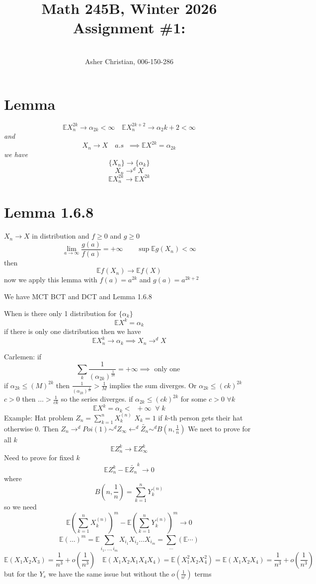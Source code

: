 \documentclass[11pt]{article}
\newcommand{\cnum}{Math 245B}
\newcommand{\ced}{Winter 2026}
\newcommand{\ctitle}[4]{\title{\vspace{-0.5in}\cnum, \ced\\Assignment #1: #2}\author{\vspace{-0.35in}\\#3, #4}}
\begin{document}
\ctitle{\#1}{}{Asher Christian}{006-150-286}
\date{}
\maketitle
\section{Lemma}
\emph{
    \[
        \mathbb{E}X^{2k}_n \rightarrow \alpha_{2k} < \infty \quad \mathbb{E}X_n^{2k+2} \rightarrow \alpha_2k+2 < \infty
    \] 
    and
    \[
        X_n \rightarrow X \quad a.s \;\; \implies \mathbb{E}X^{2k} = \alpha_{2k}
    \] 
    we have
    \[
        \{X_n\} \rightarrow \{\alpha_k\}
    \] 
    \[
    X_n \rightarrow^{d} X
    \] 
    \[
    \mathbb{E}X_n^{2k} \rightarrow \mathbb{E} X^{2k}
    \] 
}

\section{Lemma 1.6.8}
$X_n \rightarrow X$ in distribution and $f \ge 0$ and  $g \ge 0$ 
\[
\lim_{a\to \infty}\frac{g(a)}{f(a)} = +\infty \qquad \sup \mathbb{E} g(X_n) < \infty
\] 
then
\[
\mathbb{E} f(X_n) \rightarrow \mathbb{E} f(X)
\] 
now we apply this lemma with $f(a) = a^{2k}$ and $g(a) = a^{2k+2}$

We have MCT BCT and DCT and Lemma 1.6.8

When is there only 1 distribution for $\{\alpha_k\}$
\[
\mathbb{E}X^{k} = \alpha_k
\] 
if there is only one distribution then we have
\[
\mathbb{E}X_n^{k} \rightarrow \alpha_k \implies X_n \rightarrow^{d} X
\] 

Carlemen: if 
\[
    \sum_{k}^{}\frac{1}{(\alpha_{2k})^{\frac{1}{2k}}} = +\infty \implies \text{ only one }
\] 
if $\alpha_{2k} \le (M)^{2k}$ then $\frac{1}{(\alpha_{2k})^{\frac{1}{2k}}} > \frac{1}{M}$ implies the sum diverges.
Or $\alpha_{2k} \le (ck)^{2k}$ $c > 0$ then $\dots > \frac{1}{ck}$ so the series diverges.
if $\alpha_{2k} \le (ck)^{2k}$ for some $c > 0$  $\forall k$
 \[
\mathbb{E}X^{k} = \alpha_k < \;\; +\infty \;\; \forall\; k
\] 
Example: Hat problem $Z_n = \sum_{k=1}^{n}X_k^{(n)}$ $X_k = 1$ if  $k$-th person gets their hat otherwise 0.
Then  $Z_n \rightarrow^{d} Poi(1) \sim^{d} Z_\infty \leftarrow^{d} \tilde{Z_n} \sim^{d} B(n,\frac{1}{n})$ We neet to prove for all $k$
 \[
     \mathbb{E}Z_n^{k} \rightarrow \mathbb{E}Z_{\infty}^{k}
\] 
Need to prove for fixed $k$
 \[
     \mathbb{E} Z_n^{k} - \mathbb{E}\tilde{Z_n}^{k} \rightarrow 0
\] 
where
\[
B(n,\frac{1}{n}) = \sum_{k=1}^{n}Y_k^{(n)}
\] 
so we need
\[
\mathbb{E}(\sum_{k=1}^{n}X_k^{(n)})^{m} - \mathbb{E}(\sum_{k=1}^{n}Y_k^{(n)})^{m} \rightarrow 0
\] 
\[
    \mathbb{E}(\dots)^{m} = \mathbb{E}\sum_{i_1,\dots,i_m}^{}X_{i_1}X_{i_2}\dots X_{i_m} = \sum_{\dots}^{}( \mathbb{E} \cdots)
\] 
\[
\mathbb{E}(X_1X_2X_3) = \frac{1}{n^{3}}+ o(\frac{1}{n^{3}}) \quad \mathbb{E}(X_1X_2X_1X_4X_4) = \mathbb{E}(X_1^2X_2X_4^2) = \mathbb{E}(X_1X_2X_4) = \frac{1}{n^{3}} + o(\frac{1}{n^{3}})
\] 
but for the $Y_s$ we have the same issue but without the  $o(\frac{1}{n^{l}})$ terms
\end{document}
